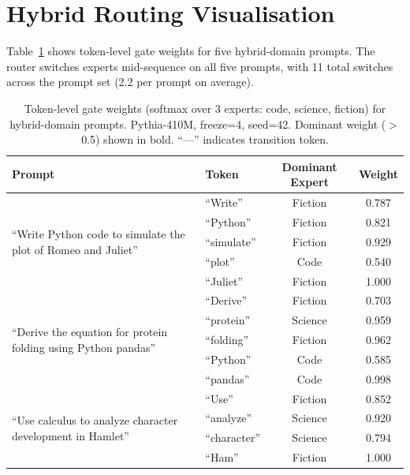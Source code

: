 \documentclass{article}
\begin{document}
\section{Hybrid Routing Visualisation}
\label{app:routing}

Table~\ref{tab:routing} shows token-level gate weights for five hybrid-domain prompts. The router switches experts mid-sequence on all five prompts, with 11 total switches across the prompt set (2.2 per prompt on average).

\begin{table}[h]
\centering
\caption{Token-level gate weights (softmax over 3 experts: code, science, fiction) for hybrid-domain prompts. Pythia-410M, freeze=4, seed=42. Dominant weight ($>$0.5) shown in bold. ``---'' indicates transition token.}
\label{tab:routing}
\small
\begin{tabular}{p{3.5cm}lcc}
\toprule
\textbf{Prompt} & \textbf{Token} & \textbf{Dominant Expert} & \textbf{Weight} \\
\midrule
\multirow{5}{*}{\parbox{3.5cm}{``Write Python code to simulate the plot of Romeo and Juliet''}}
  & ``Write''    & Fiction & 0.787 \\
  & ``Python''   & Fiction & 0.821 \\
  & ``simulate'' & Fiction & 0.929 \\
  & ``plot''     & Code    & 0.540 \\
  & ``Juliet''   & Fiction & 1.000 \\
\midrule
\multirow{5}{*}{\parbox{3.5cm}{``Derive the equation for protein folding using Python pandas''}}
  & ``Derive''   & Fiction & 0.703 \\
  & ``protein''  & Science & 0.959 \\
  & ``folding''  & Fiction & 0.962 \\
  & ``Python''   & Code    & 0.585 \\
  & ``pandas''   & Code    & 0.998 \\
\midrule
\multirow{4}{*}{\parbox{3.5cm}{``Use calculus to analyze character development in Hamlet''}}
  & ``Use''      & Fiction & 0.852 \\
  & ``analyze''  & Science & 0.920 \\
  & ``character'' & Science & 0.794 \\
  & ``Ham''      & Fiction & 1.000 \\
\bottomrule
\end{tabular}
\end{table}
\end{document}
